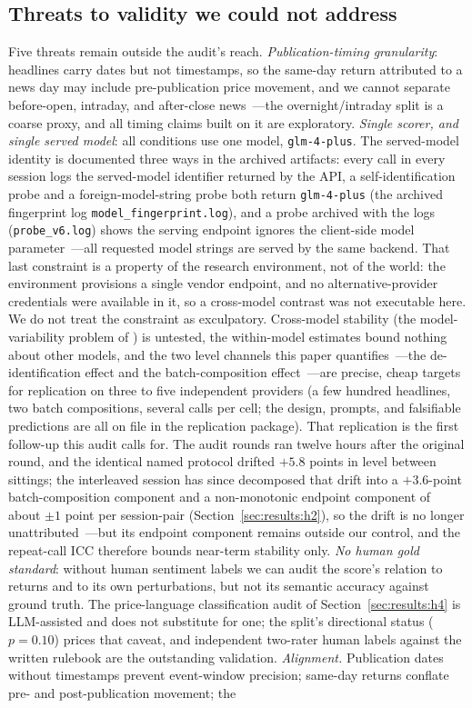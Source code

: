 \subsection{Threats to validity we could not address}
\label{sec:robust:threats}

Five threats remain outside the audit's reach. \emph{Publication-timing granularity}: headlines carry dates but not timestamps, so the same-day return attributed to a news day may include pre-publication price movement, and we cannot separate before-open, intraday, and after-close news~---the overnight/intraday split is a coarse proxy, and all timing claims built on it are exploratory. \emph{Single scorer, and single served model}: all conditions use one model, \texttt{glm-4-plus}. The served-model identity is documented three ways in the archived artifacts: every call in every session logs the served-model identifier returned by the API, a self-identification probe and a foreign-model-string probe both return \texttt{glm-4-plus} (the archived fingerprint log \texttt{model\_fingerprint.log}), and a probe archived with the logs (\texttt{probe\_v6.log}) shows the serving endpoint ignores the client-side model parameter~---all requested model strings are served by the same backend. That last constraint is a property of the research environment, not of the world: the environment provisions a single vendor endpoint, and no alternative-provider credentials were available in it, so a cross-model contrast was not executable here. We do not treat the constraint as exculpatory. Cross-model stability (the model-variability problem of \citealp{herrera2025}) is untested, the within-model estimates bound nothing about other models, and the two level channels this paper quantifies~---the de-identification effect and the batch-composition effect~---are precise, cheap targets for replication on three to five independent providers (a few hundred headlines, two batch compositions, several calls per cell; the design, prompts, and falsifiable predictions are all on file in the replication package). That replication is the first follow-up this audit calls for. The audit rounds ran twelve hours after the original round, and the identical named protocol drifted $+5.8$ points in level between sittings; the interleaved session has since decomposed that drift into a $+3.6$-point batch-composition component and a non-monotonic endpoint component of about $\pm1$ point per session-pair (Section~\ref{sec:results:h2}), so the drift is no longer unattributed~---but its endpoint component remains outside our control, and the repeat-call ICC therefore bounds near-term stability only. \emph{No human gold standard}: without human sentiment labels we can audit the score's relation to returns and to its own perturbations, but not its semantic accuracy against ground truth. The price-language classification audit of Section~\ref{sec:results:h4} is LLM-assisted and does not substitute for one; the split's directional status ($p=0.10$) prices that caveat, and independent two-rater human labels against the written rulebook are the outstanding validation. \emph{Alignment.} Publication dates without timestamps prevent event-window precision; same-day returns conflate pre- and post-publication movement; the 